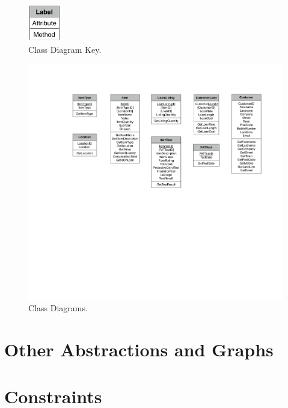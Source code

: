 \begin{landscape}
    \begin{figure}[H]
        \centerline{\includegraphics[width=54px]{./Analysis/Class_Definitions/Class_definition_key.pdf}}
        \caption{Class Diagram Key.} \label{fig:relationship_diagram}
    \end{figure}

    \begin{figure}[H]
        \centerline{\includegraphics[width=500px]{./Analysis/Class_Definitions/Class_diagrams.pdf}}
        \caption{Class Diagrams.} \label{fig:relationship_diagram}
    \end{figure}
\end{landscape}

\newpage

\section{Other Abstractions and Graphs}

\section{Constraints}


